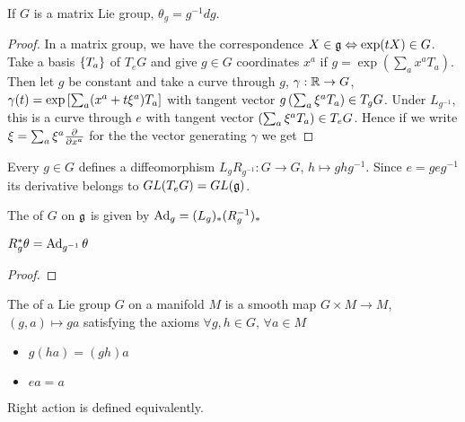 \documentclass{article}
\begin{document}
\begin{prop}
	If $G$ is a matrix Lie group, $\theta_g = g^{-1}dg$. 
\end{prop}
\begin{proof}
	In a matrix group, we have the correspondence $X \in \mathfrak{g} \Leftrightarrow \exp(tX) \in G$. Take a basis $\left\{ T_a \right\}$ of $T_eG$ and give $g\in G$ coordinates $x^a$ if $g = \exp(\sum_a x^a T_a)$. Then let $g$ be constant and take a curve through $g$, $\gamma:\mathbb{R}\to G$, $\gamma(t) = \exp\left[ \sum_a (x^a + t\xi^a)T_a \right]$ with tangent vector $g\left( \sum_a \xi^a T_a \right) \in T_gG$. Under $L_{g^{-1}}$, this is a curve through $e$ with tangent vector $\left( \sum_a \xi^a T_a \right) \in T_eG$. Hence if we write $\xi = \sum_a \xi^a \frac{\partial}{\partial x^a}$ for the the vector generating $\gamma$ we get 
\end{proof}



Every $g \in G$ defines a diffeomorphism $L_g R_{g^{-1}} : G \to G$, $h \mapsto ghg^{-1}$. Since $e = geg^{-1}$ its derivative belongs to $GL(T_e G) = GL(\mathfrak{g})$. 
\begin{definition}
	The  of $G$ on $\mathfrak{g}$ is given by $\operatorname{Ad}_g = (L_g)_\ast (R_g^{-1})_\ast$
\end{definition}

\begin{lemma}
	$R_g^\ast \theta = \operatorname{Ad}_{g^{-1}} \theta$
\end{lemma}
\begin{proof}
\end{proof}

\begin{definition}
	The  of a Lie group $G$ on a manifold $M$ is a smooth map $G \times M \to M$, $(g,a) \mapsto ga$ satisfying the axioms $\forall g,h \in G, \, \forall a \in M$
	\begin{itemize}
		\item $g(ha) = (gh)a$
		\item $ea = a$
	\end{itemize}
	Right action is defined equivalently. 
\end{definition}
\end{document}
